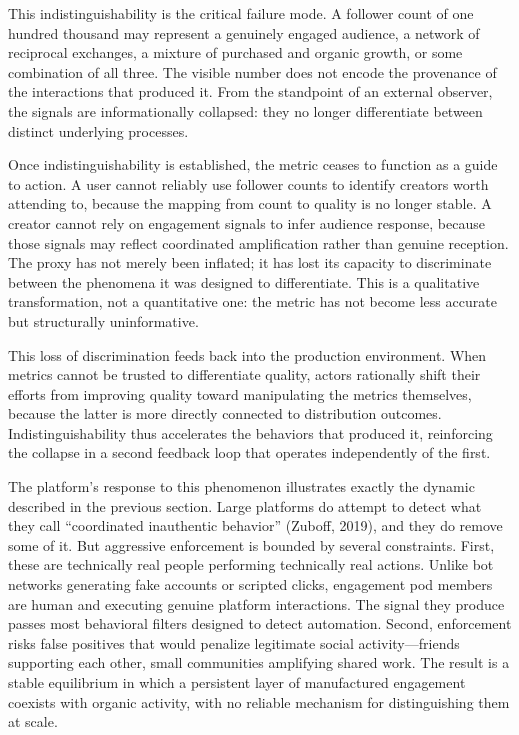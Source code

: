 \documentclass[12pt, a4paper]{article}
\begin{document}
This indistinguishability is the critical failure mode. A follower count of one hundred thousand may represent a genuinely engaged audience, a network of reciprocal exchanges, a mixture of purchased and organic growth, or some combination of all three. The visible number does not encode the provenance of the interactions that produced it. From the standpoint of an external observer, the signals are informationally collapsed: they no longer differentiate between distinct underlying processes.

Once indistinguishability is established, the metric ceases to function as a guide to action. A user cannot reliably use follower counts to identify creators worth attending to, because the mapping from count to quality is no longer stable. A creator cannot rely on engagement signals to infer audience response, because those signals may reflect coordinated amplification rather than genuine reception. The proxy has not merely been inflated; it has lost its capacity to discriminate between the phenomena it was designed to differentiate. This is a qualitative transformation, not a quantitative one: the metric has not become less accurate but structurally uninformative.

This loss of discrimination feeds back into the production environment. When metrics cannot be trusted to differentiate quality, actors rationally shift their efforts from improving quality toward manipulating the metrics themselves, because the latter is more directly connected to distribution outcomes. Indistinguishability thus accelerates the behaviors that produced it, reinforcing the collapse in a second feedback loop that operates independently of the first.

The platform's response to this phenomenon illustrates exactly the dynamic described in the previous section. Large platforms do attempt to detect what they call ``coordinated inauthentic behavior'' (Zuboff, 2019), and they do remove some of it. But aggressive enforcement is bounded by several constraints. First, these are technically real people performing technically real actions. Unlike bot networks generating fake accounts or scripted clicks, engagement pod members are human and executing genuine platform interactions. The signal they produce passes most behavioral filters designed to detect automation. Second, enforcement risks false positives that would penalize legitimate social activity---friends supporting each other, small communities amplifying shared work. The result is a stable equilibrium in which a persistent layer of manufactured engagement coexists with organic activity, with no reliable mechanism for distinguishing them at scale.
\end{document}
